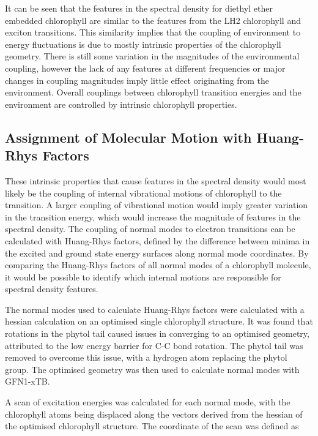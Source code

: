It can be seen that the features in the spectral density for diethyl ether embedded
chlorophyll are similar to the features from the LH2 chlorophyll and exciton transitions.
This similarity implies that the coupling of environment to energy fluctuations 
is due to mostly intrinsic properties of the chlorophyll geometry. There is still
some variation in the magnitudes of the environmental coupling, however the lack 
of any features at different frequencies or major changes in coupling magnitudes
imply little effect originating from the environment. Overall couplings between
chlorophyll transition energies and the environment are controlled by intrinsic 
chlorophyll properties.

\subsection{Assignment of Molecular Motion with Huang-Rhys Factors}
\label{subsec:hrf}

These intrinsic properties that cause features in the spectral density would most
likely be the coupling of internal vibrational motions of chlorophyll to the \Qy transition. 
A larger coupling of vibrational motion would imply greater variation in the \Qy 
transition energy, which would increase the magnitude of features in the spectral
density. The coupling of normal modes to electron transitions can be calculated 
with Huang-Rhys factors, defined by the difference between minima in the excited 
and ground state energy surfaces along normal mode coordinates. By comparing the 
Huang-Rhys factors of all normal modes of a chlorophyll molecule, it would be possible 
to identify which internal motions are responsible for spectral density features.

The normal modes used to calculate Huang-Rhys factors were calculated with a hessian
calculation on an optimised single chlorophyll structure. It was found that rotations
in the phytol tail caused issues in converging to an optimised geometry, attributed
to the low energy barrier for C-C bond rotation. The phytol tail was removed to
overcome this issue, with a hydrogen atom replacing the phytol group. The optimised
geometry was then used to calculate normal modes with GFN1-xTB.

A scan of excitation energies was calculated for each normal mode, with the chlorophyll
atoms being displaced along the vectors derived from the hessian of the optimised
chlorophyll structure. The coordinate of the scan was defined as 

